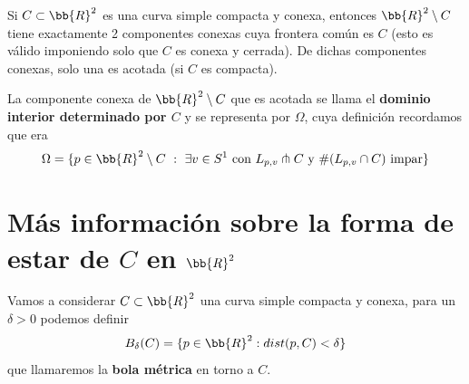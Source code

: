 \begin{teo}\label{teo:curva_jordan}
    Si $C\subset \bb{R}^2$ es una curva simple compacta y conexa, entonces $\bb{R}^2 \setminus C$ tiene exactamente 2 componentes conexas cuya frontera común es $C$ (esto es válido imponiendo solo que $C$ es conexa y cerrada). De dichas componentes conexas, solo una es acotada (si $C$ es compacta).
\end{teo}

\begin{definicion}
    La componente conexa de $\bb{R}^2\setminus C$ que es acotada se llama el \textbf{dominio interior determinado por $C$} y se representa por $\Omega$, cuya definición recordamos que era
    \begin{gather*}
        \Omega = \{p\in \bb{R}^2 \setminus C \ : \ \exists v \in S^1 \text{ con } L_{p,v}\transv C \text{ y } \#(L_{p,v} \cap C) \text{ impar}\}
    \end{gather*} 
\end{definicion}

\section{Más información sobre la forma de estar de $C$ en $\bb{R}^2$}
\begin{definicion}
    Vamos a considerar $C\subset \bb{R}^2$ una curva simple compacta y conexa, para un $\delta>0$ podemos definir
    \begin{gather*}
        B_\delta(C) = \{p\in \bb{R}^2 : dist(p,C) < \delta\}
    \end{gather*}
    que llamaremos la \textbf{bola métrica} en torno a $C$.
\end{definicion}

